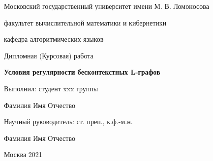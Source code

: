 \thispagestyle{empty}
\begin{center}
{
    \large
    Московский государственный университет имени М. В. Ломоносова\par
    факультет вычислительной математики и кибернетики\par
    кафедра алгоритмических языков\par
}
\par
\end{center}

\vspace{10mm}
\begin{flushright}

{\sl}%
\end{flushright}

\begin{center}
%


\vspace{30mm}
Дипломная (Курсовая) работа

\vspace{5mm}
{
    \bf \large
    Условия регулярности бесконтекстных L-графов
    \par
}

\end{center}

\vspace{20mm}
\begin{flushright}
Выполнил: студент xxx группы

Фамилия Имя Отчество

\vspace{10mm}
Научный руководитель: ст. преп., к.ф.-м.н.

Фамилия Имя Отчество
\end{flushright}

\vspace{20mm}
\begin{center}
{Москва 2021}
\end{center}

\newpage
